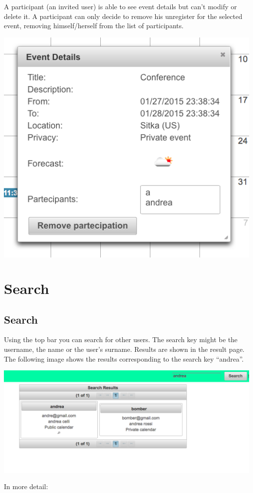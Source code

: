 \documentclass[10pt,a4paper,titlepage]{article}
\begin{document}
A participant (an invited user) is able to see event details but can’t modify or delete it. A participant can only decide to remove his unregister for the selected event, removing himself/herself from the list of participants.

\begin{center}
\includegraphics[width=0.7\linewidth]{./images/18_details_partecipant}
\end{center}


\section{Search}

\subsection{Search}
Using the top bar you can search for other users. The search key might be the username, the name or the user’s surname. Results are shown in the result page. The following image shows the results corresponding to the search key “andrea”.

\begin{center}
\includegraphics[width=0.7\linewidth]{./images/19_search_results}
\end{center}

In more detail:
\end{document}
